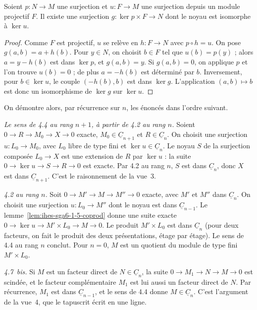 \begin{lemme}\label{lem:ihes-sga6-1-5-coprod}
Soient $p : N \to M$ une surjection et $u : F \to M$ une surjection depuis un module projectif $F$. Il existe une surjection $g : \ker p \times F \to N$ dont le noyau est isomorphe à $\ker u$.
\end{lemme}

\begin{proof}
Comme $F$ est projectif, $u$ se relève en $h : F \to N$ avec $p \circ h = u$. On pose $g(a, b) = a + h(b)$. Pour $y \in N$, on choisit $b \in F$ tel que $u(b) = p(y)$ ; alors $a = y - h(b)$ est dans $\ker p$, et $g(a, b) = y$. Si $g(a, b) = 0$, on applique $p$ et l'on trouve $u(b) = 0$ ; de plus $a = -h(b)$ est déterminé par $b$. Inversement, pour $b \in \ker u$, le couple $(-h(b), b)$ est dans $\ker g$. L'application $(a, b) \mapsto b$ est donc un isomorphisme de $\ker g$ sur $\ker u$.
\end{proof}

\noindent On démontre alors, par récurrence sur $n$, les énoncés dans l'ordre suivant.

\emph{Le sens  de 4.4 au rang $n + 1$, à partir de 4.2 au rang $n$.} Soient $0 \to R \to M_0 \to X \to 0$ exacte, $M_0 \in \underline C_{n+1}$ et $R \in \underline C_n$. On choisit une surjection $u : L_0 \to M_0$, avec $L_0$ libre de type fini et $\ker u \in \underline C_n$. Le noyau $S$ de la surjection composée $L_0 \to X$ est une extension de $R$ par $\ker u$ : la suite $0 \to \ker u \to S \to R \to 0$ est exacte. Par 4.2 au rang $n$, $S$ est dans $\underline C_n$, donc $X$ est dans $\underline C_{n+1}$. C'est le raisonnement de la vue~3.

\emph{4.2 au rang $n$.} Soit $0 \to M' \to M \to M'' \to 0$ exacte, avec $M'$ et $M''$ dans $\underline C_n$. On choisit une surjection $u : L_0 \to M''$ dont le noyau est dans $\underline C_{n-1}$. Le lemme~\ref{lem:ihes-sga6-1-5-coprod} donne une suite exacte $0 \to \ker u \to M' \times L_0 \to M \to 0$. Le produit $M' \times L_0$ est dans $\underline C_n$ (pour deux facteurs, on fait le produit des deux présentations, étage par étage). Le sens  de 4.4 au rang $n$ conclut. Pour $n = 0$, $M$ est un quotient du module de type fini $M' \times L_0$.

\emph{4.7~bis.} Si $M$ est un facteur direct de $N \in \underline C_n$, la suite $0 \to M_1 \to N \to M \to 0$ est scindée, et le facteur complémentaire $M_1$ est lui aussi un facteur direct de $N$. Par récurrence, $M_1$ est dans $\underline C_{n-1}$, et le sens  de 4.4 donne $M \in \underline C_n$. C'est l'argument de la vue~4, que le tapuscrit écrit en une ligne.

